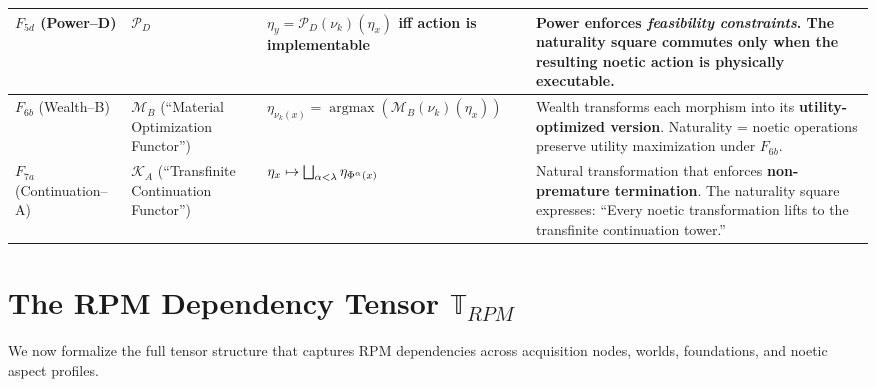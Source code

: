 \begin{longtable}{p{2cm}|p{2cm}|p{2.5cm}|p{4.5cm}}
\midrule

$F_{5d}$ (Power--D)
& $\mathcal{P}_D$
& $\eta_y = \mathcal{P}_D(\nu_k)(\eta_x)$ iff action is implementable
& Power enforces \emph{feasibility constraints}.
  The naturality square commutes only when the resulting noetic action is physically executable.
\\

\midrule

$F_{6b}$ (Wealth--B)
& $\mathcal{M}_B$ (``Material Optimization Functor'')
& $\eta_{\nu_k(x)} = \operatorname*{argmax}(\mathcal{M}_B(\nu_k)(\eta_x))$
& Wealth transforms each morphism into its \textbf{utility-optimized version}.
  Naturality = noetic operations preserve utility maximization under $F_{6b}$.
\\

\midrule

$F_{7a}$ (Continuation--A)
& $\mathcal{K}_A$ (``Transfinite Continuation Functor'')
& $\eta_x \mapsto \bigsqcup_{\alpha < \lambda} \eta_{\Phi^{\alpha}(x)}$
& Natural transformation that enforces \textbf{non-premature termination}.
  The naturality square expresses:
  ``Every noetic transformation lifts to the transfinite continuation tower.''
\\

\end{longtable}

\section{The RPM Dependency Tensor $\mathbb{T}_{RPM}$}

We now formalize the full tensor structure that captures RPM dependencies
across acquisition nodes, worlds, foundations, and noetic aspect profiles.

